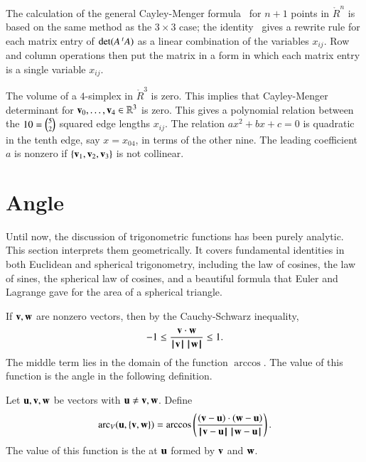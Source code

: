 The calculation of the general Cayley-Menger formula~ for
$n+1$ points in $\ring{R}^n$ is based on the same method as the $3\times 3$ case; the identity~ gives a rewrite rule for each
matrix entry of $\det(A\,\hbox{}^t A)$ as a linear combination of the
variables $x_{ij}$.  Row and column operations then put the matrix in
a form in which each matrix entry is a single variable $x_{ij}$.

\begin{remark}[]\label{rem:CM5}
  The volume of a $4$-simplex in $\ring{R}^3$ is zero.  This implies
  that Cayley-Menger determinant for ${\mathbf v}_0,\ldots,{\mathbf v}_4\in\mathbb{R}^3$
  is zero.  %
  This gives a polynomial relation between the $10 = \tbinom{5}{2}$
  squared edge lengths $x_{ij}$.  The relation $a x^2 + b x + c=0$ is
  quadratic in the tenth edge, say $x=x_{04}$, in terms of the other
  nine. The leading coefficient $a$ is nonzero if $\{{\mathbf v}_1,{\mathbf v}_2,{\mathbf v}_3\}$
  is not collinear.%
\end{remark}

\section{Angle}\label{sec:angle}

Until now, the discussion of trigonometric functions has been purely
analytic.  This section interprets them geometrically.  It covers
fundamental identities in both Euclidean and spherical trigonometry,
including the law of cosines, the law of sines, the spherical law of
cosines, and a beautiful formula that Euler and Lagrange gave for the area of a spherical triangle.

If ${\mathbf v},{\mathbf w}$ are nonzero vectors, then by the
Cauchy-Schwarz inequality,
\begin{displaymath}-1 \le \frac{{\mathbf v}\cdot {\mathbf w}}{{{\hskip0.1em|\hskip-0.15em|\hskip0.1em}{\mathbf v}{\hskip0.1em|\hskip-0.15em|\hskip0.1em}}\,{{\hskip0.1em|\hskip-0.15em|\hskip0.1em}{\mathbf w}{\hskip0.1em|\hskip-0.15em|\hskip0.1em}}}
  \le 1.\end{displaymath} The middle term  lies in the
domain of the function $\arccos$. The value of this function is the angle in  the following
definition.  %
%
%

\begin{definition}\label{def:angle}
Let ${\mathbf u},{\mathbf v},{\mathbf w}$ be vectors with ${\mathbf u}\ne {\mathbf v},{\mathbf w}$.
Define 
\begin{displaymath}
  \arc_V(\u,\{\v,\w\}) = \arccos\left(\frac{(\v-\u)\cdot 
(\w-\u)}{\norm{\v}{\u}\,\norm{\w}{\u}}\right).
\end{displaymath}
The value of this function is the  at ${\mathbf u}$ formed by
${\mathbf v}$ and ${\mathbf w}$.  %
%
%
%
%
\end{definition}

